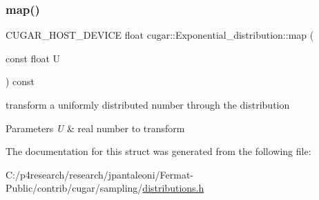 \subsubsection{\texorpdfstring{map()}{map()}}
{\footnotesize\ttfamily C\+U\+G\+A\+R\+\_\+\+H\+O\+S\+T\+\_\+\+D\+E\+V\+I\+CE float cugar\+::\+Exponential\+\_\+distribution\+::map (\begin{DoxyParamCaption}\item[{const float}]{U }\end{DoxyParamCaption}) const\hspace{0.3cm}{\ttfamily [inline]}}

transform a uniformly distributed number through the distribution


\begin{DoxyParams}{Parameters}
{\em U} & real number to transform \\
\hline
\end{DoxyParams}


The documentation for this struct was generated from the following file\+:\begin{DoxyCompactItemize}
\item 
C\+:/p4research/research/jpantaleoni/\+Fermat-\/\+Public/contrib/cugar/sampling/\hyperlink{distributions_8h}{distributions.\+h}\end{DoxyCompactItemize}
